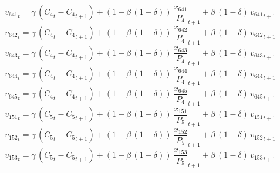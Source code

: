 \begin{dmath}
{{v_{641}}}_{t}={{\gamma}}\, \left({{C_{4}}}_{t}-{{C_{4}}}_{t+1}\right)+\left(1-{{\beta}}\, \left(1-{{\delta}}\right)\right)\, {{\frac{x_{641}}{P_{4}}}}_{t+1}+{{\beta}}\, \left(1-{{\delta}}\right)\, {{v_{641}}}_{t+1}
\end{dmath}
\begin{dmath}
{{v_{642}}}_{t}={{\gamma}}\, \left({{C_{4}}}_{t}-{{C_{4}}}_{t+1}\right)+\left(1-{{\beta}}\, \left(1-{{\delta}}\right)\right)\, {{\frac{x_{642}}{P_{4}}}}_{t+1}+{{\beta}}\, \left(1-{{\delta}}\right)\, {{v_{642}}}_{t+1}
\end{dmath}
\begin{dmath}
{{v_{643}}}_{t}={{\gamma}}\, \left({{C_{4}}}_{t}-{{C_{4}}}_{t+1}\right)+\left(1-{{\beta}}\, \left(1-{{\delta}}\right)\right)\, {{\frac{x_{643}}{P_{4}}}}_{t+1}+{{\beta}}\, \left(1-{{\delta}}\right)\, {{v_{643}}}_{t+1}
\end{dmath}
\begin{dmath}
{{v_{644}}}_{t}={{\gamma}}\, \left({{C_{4}}}_{t}-{{C_{4}}}_{t+1}\right)+\left(1-{{\beta}}\, \left(1-{{\delta}}\right)\right)\, {{\frac{x_{644}}{P_{4}}}}_{t+1}+{{\beta}}\, \left(1-{{\delta}}\right)\, {{v_{644}}}_{t+1}
\end{dmath}
\begin{dmath}
{{v_{645}}}_{t}={{\gamma}}\, \left({{C_{4}}}_{t}-{{C_{4}}}_{t+1}\right)+\left(1-{{\beta}}\, \left(1-{{\delta}}\right)\right)\, {{\frac{x_{645}}{P_{4}}}}_{t+1}+{{\beta}}\, \left(1-{{\delta}}\right)\, {{v_{645}}}_{t+1}
\end{dmath}
\begin{dmath}
{{v_{151}}}_{t}={{\gamma}}\, \left({{C_{5}}}_{t}-{{C_{5}}}_{t+1}\right)+\left(1-{{\beta}}\, \left(1-{{\delta}}\right)\right)\, {{\frac{x_{151}}{P_{5}}}}_{t+1}+{{\beta}}\, \left(1-{{\delta}}\right)\, {{v_{151}}}_{t+1}
\end{dmath}
\begin{dmath}
{{v_{152}}}_{t}={{\gamma}}\, \left({{C_{5}}}_{t}-{{C_{5}}}_{t+1}\right)+\left(1-{{\beta}}\, \left(1-{{\delta}}\right)\right)\, {{\frac{x_{152}}{P_{5}}}}_{t+1}+{{\beta}}\, \left(1-{{\delta}}\right)\, {{v_{152}}}_{t+1}
\end{dmath}
\begin{dmath}
{{v_{153}}}_{t}={{\gamma}}\, \left({{C_{5}}}_{t}-{{C_{5}}}_{t+1}\right)+\left(1-{{\beta}}\, \left(1-{{\delta}}\right)\right)\, {{\frac{x_{153}}{P_{5}}}}_{t+1}+{{\beta}}\, \left(1-{{\delta}}\right)\, {{v_{153}}}_{t+1}
\end{dmath}
